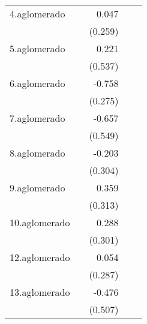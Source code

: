 {\begin{longtable}{l*{4}{D{.}{.}{-1}}}
\addlinespace
4.aglomerado&                     &       0.047         &                     &                     \\
            &                     &     (0.259)         &                     &                     \\
\addlinespace
5.aglomerado&                     &       0.221         &                     &                     \\
            &                     &     (0.537)         &                     &                     \\
\addlinespace
6.aglomerado&                     &      -0.758\sym{**} &                     &                     \\
            &                     &     (0.275)         &                     &                     \\
\addlinespace
7.aglomerado&                     &      -0.657         &                     &                     \\
            &                     &     (0.549)         &                     &                     \\
\addlinespace
8.aglomerado&                     &      -0.203         &                     &                     \\
            &                     &     (0.304)         &                     &                     \\
\addlinespace
9.aglomerado&                     &       0.359         &                     &                     \\
            &                     &     (0.313)         &                     &                     \\
\addlinespace
10.aglomerado&                     &       0.288         &                     &                     \\
            &                     &     (0.301)         &                     &                     \\
\addlinespace
12.aglomerado&                     &       0.054         &                     &                     \\
            &                     &     (0.287)         &                     &                     \\
\addlinespace
13.aglomerado&                     &      -0.476         &                     &                     \\
            &                     &     (0.507)         &                     &                     \\

\end{longtable}}

